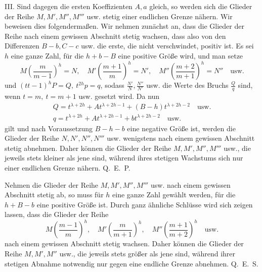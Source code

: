 III. Sind dagegen die ersten Koeffizienten $A,a$ gleich, so werden sich die Glieder der Reihe $M,\allowbreak M',\allowbreak M'',\allowbreak M'''$ usw. stetig einer endlichen Grenze nähern. Wir beweisen dies folgendermaßen. Wir nehmen zunächst an, dass die Glieder der Reihe nach einem gewissen Abschnitt stetig wachsen, dass also von den Differenzen $B-b,C-c$ usw. die erste, die nicht verschwindet,
positiv ist. Es sei $h$ eine ganze Zahl, für die $h+b-B$ eine positive Größe wird, und man setze
\[
M\left(\frac{m}{m-1}\right)^h=N,\quad
M'\left(\frac{m+1}{m}\right)^h=N',\quad
M''\left(\frac{m+2}{m+1}\right)^h=N''\quad\mathrm{usw.}
\]
und $(tt-1)^hP=Q,\ t^{2h}p=q$, sodass $\frac{N'}{N},\frac{N''}{N'}$ usw. die Werte des Bruchs $\frac{Q}{q}$ sind, wenn $t=m,\ t=m+1$ usw. gesetzt wird. Da nun
\[
\begin{array}{l}
Q=t^{\lambda+2h}+At^{\lambda+2h-1}+(B-h)t^{\lambda+2h-2}\quad\mathrm{usw.}\\
q=t^{\lambda+2h}+At^{\lambda+2h-1}+bt^{\lambda+2h-2}\quad\mathrm{usw.}
\end{array}
\]
gilt und nach Voraussetzung $B-h-b$ eine negative Größe ist, werden die Glieder der Reihe $N,N',N'',N'''$ usw. wenigstens nach einem gewissen Abschnitt stetig abnehmen. Daher können die Glieder der Reihe $M,M',M'',M'''$ usw., die jeweils stets kleiner als jene sind, während ihres stetigen Wachstums sich nur einer endlichen Grenze nähern. Q.~E.~P.

Nehmen die Glieder der Reihe $M,M',M'',M'''$ usw. nach einem gewissen Abschnitt stetig ab, so muss für $h$ eine ganze Zahl gewählt werden, für die $h+B-b$ eine positive Größe ist. Durch ganz ähnliche Schlüsse wird sich zeigen lassen, dass die Glieder der Reihe
\[
M\left(\frac{m-1}{m}\right)^h,\quad
M'\left(\frac{m}{m+1}\right)^h,\quad
M''\left(\frac{m+1}{m+2}\right)^h\quad\mathrm{usw.}
\]
nach einem gewissen Abschnitt stetig wachsen. Daher können die Glieder der Reihe $M,M',M''$ usw., die jeweils stets größer als jene sind, während ihrer stetigen Abnahme notwendig nur gegen eine endliche Grenze abnehmen. Q.~E.~S.

